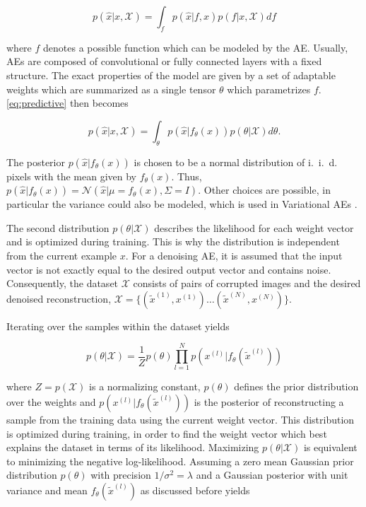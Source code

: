 \documentclass[10pt,twocolumn,a4paper]{article}
\newcommand{\iid}{i.~i.~d. }
\newcommand{\normal}{\mathcal N}
\newcommand{\tx}{\tilde x}
\newcommand{\ds}{\mathcal X}
\begin{document}
\begin{equation}
    p(\hat x | x, \ds) = \int_{f} p(\hat x | f, x) p(f | x, \ds) df \label{eq:predictive}
\end{equation}

where $f$ denotes a possible function which can be modeled by the AE.
Usually, AEs are composed of convolutional or fully connected layers with a fixed structure.
The exact properties of the model are given by a set of adaptable weights which are summarized as a single tensor $\theta$ which parametrizes $f$.
\eqref{eq:predictive} then becomes

\begin{equation}
    p(\hat x | x, \ds) = \int_{\theta} p(\hat x | f_\theta(x)) p(\theta | \ds) d\theta .
\end{equation}

The posterior $p(\hat x | f_\theta(x))$ is chosen to be a normal distribution of \iid pixels with the mean given by $f_\theta(x)$.
Thus, $p(\hat x | f_\theta(x)) = \normal (\hat x | \mu=f_\theta(x), \Sigma=I)$.
Other choices are possible, in particular the variance could also be modeled, which is used in Variational AEs \cite{Kingma2014}.

The second distribution $p(\theta | \ds)$ describes the likelihood for each weight vector and is optimized during training. This is why the distribution is independent from the current example $x$. 
For a denoising AE, it is assumed that the input vector is not exactly equal to the desired output vector and contains noise.
Consequently, the dataset $\ds$ consists of pairs of corrupted images and the desired denoised reconstruction, \ie $\ds = \{(\tx^{(1)}, x^{(1)}) \dots (\tx^{(N)}, x^{(N)})\}$.

Iterating over the samples within the dataset yields

\begin{equation}
    p(\theta | \ds) = \frac{1}{Z} p(\theta)
    		\prod_{l = 1}^{N} p(x^{(l)} | f_\theta (\tx^{(l)}))
\end{equation}

where $Z=p(\ds)$ is a normalizing constant, $p(\theta)$ defines the prior distribution over the weights and $p(x^{(l)} | f_\theta (\tx^{(l)}))$ is the posterior of reconstructing a sample from the training data using the current weight vector.
This distribution is optimized during training, in order to find the weight vector which best explains the dataset in terms of its likelihood.
Maximizing $p(\theta | \ds)$ is equivalent to minimizing the negative log-likelihood.
Assuming a zero mean Gaussian prior distribution $p(\theta)$ with precision $1/\sigma^2 = \lambda$ and a Gaussian posterior with unit variance and mean $f_\theta(\tx^{(l)})$ as discussed before yields
\end{document}
